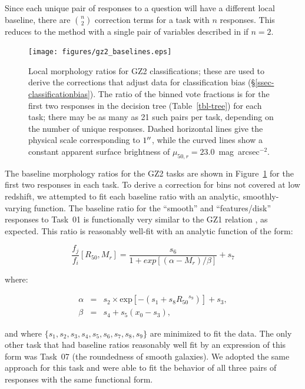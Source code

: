 \documentclass[useAMS,usenatbib]{mn2e}
\begin{document}
Since each unique pair of responses to a question will have a different local baseline, there are $\binom{n}{2}$ correction terms for a task with $n$ responses. This reduces to the method with a single pair of variables described in \citet{bam09} if $n=2$. 

\begin{figure}
\texttt{[image: figures/gz2\_baselines.eps]}
\caption{Local morphology ratios for GZ2 classifications; these are used to derive the corrections that adjust data for classification bias (\S\ref{ssec-classificationbias}). The ratio of the binned vote fractions is for the first two responses in the decision tree (Table~\ref{tbl-tree}) for each task; there may be as many as 21 such pairs per task, depending on the number of unique responses. Dashed horizontal lines give the physical scale corresponding to $1\hbox{$^{\prime\prime}$}$, while the curved lines show a constant apparent surface brightness of $\mu_{50,r}=23.0$~mag~arcsec$^{-2}$.
\label{fig-baselines}}
\end{figure}

The baseline morphology ratios for the GZ2 tasks are shown in Figure~\ref{fig-baselines} for the first two responses in each task. To derive a correction for bins not covered at low redshift, we attempted to fit each baseline ratio with an analytic, smoothly-varying function. The baseline ratio for the ``smooth'' and ``features/disk'' responses to Task~01 is functionally very similar to the GZ1 relation \citep[Figure~A5 in ][]{bam09}, as expected. This ratio is reasonably well-fit with an analytic function of the form: %

\begin{equation}
\frac{f_j}{f_i}[R_{50},M_r] = \frac{s_6}{1 + exp[(\alpha - M_r)/\beta]} + s_7
\label{eqn-sb}
\end{equation}

\noindent where:

\begin{eqnarray}
\alpha &=& s_2\times\text{exp}[{-\left(s_1 + s_8{R_{50}}^{s_9}\right)}] + s_3, \\
\beta  &=& s_4 + s_5(x_0 - s_3),
\end{eqnarray}

\noindent and where $\{s_1,s_2,s_3,s_4,s_5,s_6,s_7,s_8,s_9\}$ are minimized to fit the data. The only other task that had baseline ratios reasonably well fit by an expression of this form was Task~07 (the roundedness of smooth galaxies). We adopted the same approach for this task and were able to fit the behavior of all three pairs of responses with the same functional form. 
\end{document}
